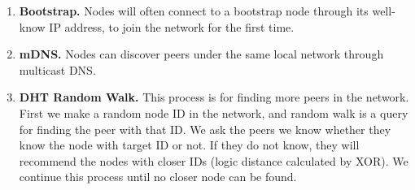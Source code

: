 \begin{enumerate}
    \item \textbf{Bootstrap.} Nodes will often connect to a bootstrap node through its well-know IP address, to join the network for the first time.
    \item \textbf{mDNS.} Nodes can discover peers under the same local network through multicast DNS.
    \item \textbf{DHT Random Walk.} This process is for finding more peers in the network. First we make a random node ID in the network, and random walk is a query for finding the peer with that ID.
          We ask the peers we know whether they know the node with target ID or not.
          If they do not know, they will recommend the nodes with closer IDs (logic distance calculated by XOR). We continue this process until no closer node can be found.
\end{enumerate}


